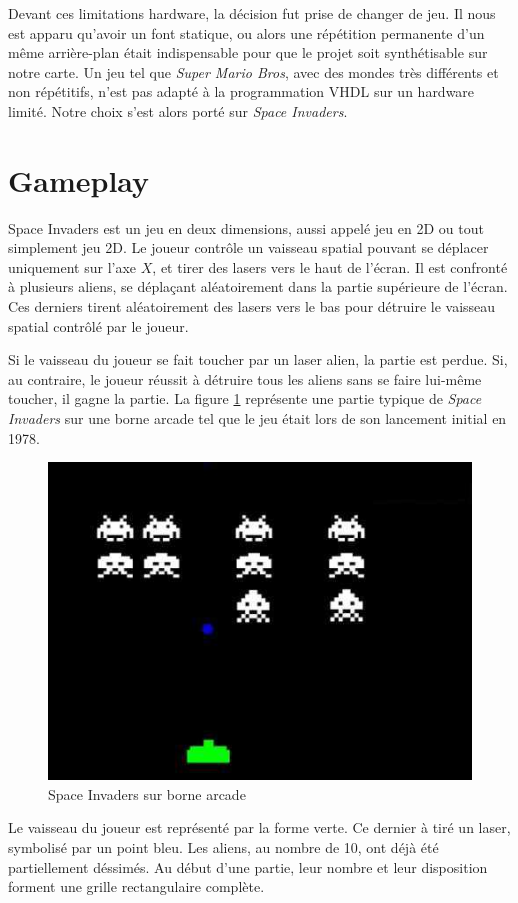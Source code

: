 \documentclass[french]{nakrule}
\begin{document}
Devant ces limitations hardware, la décision fut prise de changer de jeu. Il nous
est apparu qu'avoir un font statique, ou alors une répétition permanente d'un
même arrière-plan était indispensable pour que le projet soit synthétisable sur
notre carte. Un jeu tel que \emph{Super Mario Bros}, avec des mondes très
différents et non répétitifs, n'est pas adapté à la programmation VHDL sur un
hardware limité. Notre choix s'est alors porté sur \emph{Space Invaders}.


\clearpage
\symmetricalPage

\section{Gameplay}
\label{sec:gameplay}

Space Invaders est un jeu en deux dimensions, aussi appelé jeu en 2D ou tout
simplement jeu 2D. Le joueur contrôle un vaisseau spatial pouvant se déplacer
uniquement sur l'axe $X$, et tirer des lasers vers le haut de l'écran. Il est
confronté à plusieurs aliens, se déplaçant aléatoirement dans la partie
supérieure de l'écran. Ces derniers tirent aléatoirement des lasers vers le bas
pour détruire le vaisseau spatial contrôlé par le joueur.

Si le vaisseau du joueur se fait toucher par un laser alien, la partie est
perdue. Si, au contraire, le joueur réussit à détruire tous les aliens sans se
faire lui-même toucher, il gagne la partie. La figure \ref{gameOnArcade} représente une
partie typique de \emph{Space Invaders} sur une borne arcade tel que le jeu était
lors de son lancement initial en 1978.

\begin{figure}[ht]
  \centering
  \includegraphics[width=.6\textwidth]{pictures/gameOnArcade}
  \caption{Space Invaders sur borne arcade}
  \label{gameOnArcade}
\end{figure}

Le vaisseau du joueur est représenté par la forme verte. Ce dernier à tiré un
laser, symbolisé par un point bleu. Les aliens, au nombre de 10, ont déjà été
partiellement déssimés. Au début d'une partie, leur nombre et leur disposition
forment une grille rectangulaire complète.
\end{document}
